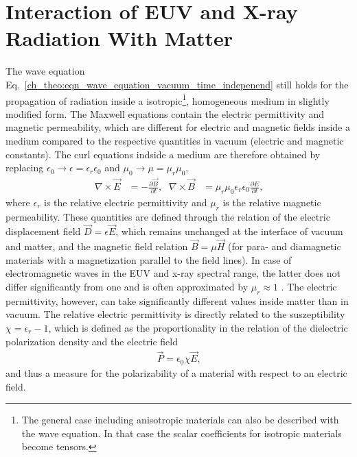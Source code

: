 \section{Interaction of EUV and X-ray Radiation With Matter} \label{ch_theo:sec_interaction}
The wave equation Eq.~\eqref{ch_theo:eqn_wave_equation_vacuum_time_indepenend} still holds for the propagation of radiation inside a isotropic\footnote{The general case including anisotropic materials can also be described with the wave equation. In that case the scalar coefficients for isotropic materials become tensors.}, homogeneous medium in slightly modified form. The Maxwell equations contain the electric permittivity and magnetic permeability, which are different for electric and magnetic fields inside a medium compared to the respective quantities in vacuum (electric and magnetic constants). The curl equations indside a medium are therefore obtained by replacing $\epsilon_0 \rightarrow \epsilon = \epsilon_r \epsilon_0$ and $\mu_0 \rightarrow \mu = \mu_r \mu_0$,
\begin{align}
 \nabla \times \vec{E} & = -\frac{\partial \vec{B}}{\partial t}\text{,} & \nabla \times \vec{B} &= \mu_r \mu_0 \epsilon_r \epsilon_0 \frac{\partial E}{\partial t} \text{,}
\end{align}
where $\epsilon_r$ is the relative electric permittivity and $\mu_r$ is the relative magnetic permeability. These quantities are defined through the relation of the electric displacement field $\vec{D} = \epsilon \vec{E}$, which remains unchanged at the interface of vacuum and matter, and the magnetic field relation $\vec{B} = \mu \vec{H}$ (for para- and diamagnetic materials with a magnetization parallel to the field lines).  In case of electromagnetic waves in the EUV and x-ray spectral range, the latter does not differ significantly from one and is often approximated by $\mu_r \approx 1$ \cite{bergevin_interaction_2009}. The electric permittivity, however, can take significantly different values inside matter than in vacuum. The relative electric permittivity is directly related to the suszeptibility $\chi = \epsilon_r - 1$, which is defined as the proportionality in the relation of the dielectric polarization density and the electric field
\begin{align}
 \vec{P} = \epsilon_0 \chi \vec{E}\text{,}
\end{align}
and thus a measure for the polarizability of a material with respect to an electric field.

